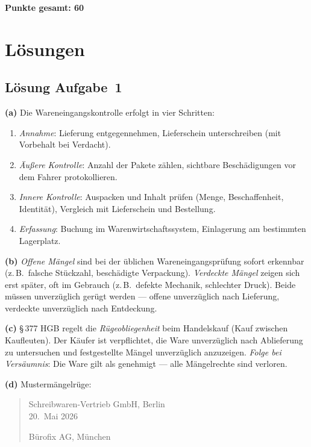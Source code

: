 \documentclass[11pt, a4paper]{article}
\begin{document}
\vspace{1em}
\noindent\textbf{Punkte gesamt: 60}

\newpage

\section{Lösungen}\label{loesungen}

\subsection*{Lösung Aufgabe~1}
\begin{loesung}
\textbf{(a)} Die Wareneingangskontrolle erfolgt in vier Schritten:
\begin{enumerate}[itemsep=0pt]
  \item \emph{Annahme}: Lieferung entgegennehmen, Lieferschein unterschreiben (mit Vorbehalt bei Verdacht).
  \item \emph{Äußere Kontrolle}: Anzahl der Pakete zählen, sichtbare Beschädigungen vor dem Fahrer protokollieren.
  \item \emph{Innere Kontrolle}: Auspacken und Inhalt prüfen (Menge, Beschaffenheit, Identität), Vergleich mit Lieferschein und Bestellung.
  \item \emph{Erfassung}: Buchung im Warenwirtschafts­system, Einlagerung am bestimmten Lagerplatz.
\end{enumerate}

\textbf{(b)} \emph{Offene Mängel} sind bei der üblichen Wareneingangsprüfung sofort
erkennbar (z.\,B.\ falsche Stückzahl, beschädigte Verpackung). \emph{Verdeckte Mängel}
zeigen sich erst später, oft im Gebrauch (z.\,B.\ defekte Mechanik, schlechter Druck).
Beide müssen unverzüglich gerügt werden --- offene unverzüglich nach Lieferung,
verdeckte unverzüglich nach Entdeckung.

\textbf{(c)} §\,377 HGB regelt die \emph{Rügeobliegenheit} beim Handelskauf (Kauf
zwischen Kaufleuten). Der Käufer ist verpflichtet, die Ware unverzüglich nach Ablieferung
zu untersuchen und festgestellte Mängel unverzüglich anzuzeigen. \emph{Folge bei
Versäumnis}: Die Ware gilt als genehmigt --- alle Mängelrechte sind verloren.

\textbf{(d)} Mustermängelrüge:

\begin{quote}\small
Schreibwaren-Vertrieb GmbH, Berlin \\
20.~Mai 2026

\medskip
Bürofix AG, München


\end{quote}
\end{loesung}
\end{document}
